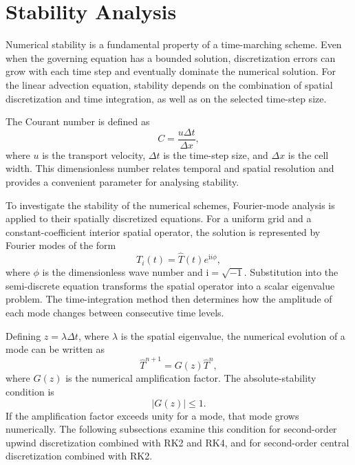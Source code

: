 \section{Stability Analysis}
\label{sec:stability-analysis}

Numerical stability is a fundamental property of a time-marching scheme. Even when the governing equation has a bounded solution, discretization errors can grow with each time step and eventually dominate the numerical solution. For the linear advection equation, stability depends on the combination of spatial discretization and time integration, as well as on the selected time-step size.

The Courant number is defined as
\begin{equation}
    C = \frac{u\Delta t}{\Delta x},
    \label{eq:courant-number}
\end{equation}
where $u$ is the transport velocity, $\Delta t$ is the time-step size, and $\Delta x$ is the cell width. This dimensionless number relates temporal and spatial resolution and provides a convenient parameter for analysing stability.

To investigate the stability of the numerical schemes, Fourier-mode analysis is applied to their spatially discretized equations. For a uniform grid and a constant-coefficient interior spatial operator, the solution is represented by Fourier modes of the form
\begin{equation}
    T_i(t) = \widehat{T}(t)e^{\mathrm{i}i\phi},
    \label{eq:fourier-mode}
\end{equation}
where $\phi$ is the dimensionless wave number and $\mathrm{i}=\sqrt{-1}$. Substitution into the semi-discrete equation transforms the spatial operator into a scalar eigenvalue problem. The time-integration method then determines how the amplitude of each mode changes between consecutive time levels.

Defining $z=\lambda\Delta t$, where $\lambda$ is the spatial eigenvalue, the numerical evolution of a mode can be written as
\begin{equation}
    \widehat{T}^{n+1} = G(z)\widehat{T}^{n},
    \label{eq:amplification-evolution}
\end{equation}
where $G(z)$ is the numerical amplification factor. The absolute-stability condition is
\begin{equation}
    \boxed{|G(z)|\leq 1}.
    \label{eq:absolute-stability}
\end{equation}
If the amplification factor exceeds unity for a mode, that mode grows numerically. The following subsections examine this condition for second-order upwind discretization combined with RK2 and RK4, and for second-order central discretization combined with RK2.

